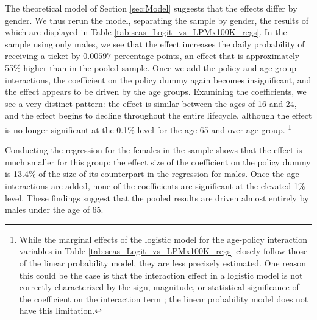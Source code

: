 The theoretical model of Section \ref{sec:Model} 
suggests that the effects differ by gender. 
We thus rerun the model, separating the sample by gender, 
the results of which are displayed in 
Table \ref{tab:seas_Logit_vs_LPMx100K_regs}.
In the sample using only males, 
we see that the effect increases the daily probability of receiving a ticket by $0.00597$ 
percentage points, an effect that is approximately 55\% higher than in the pooled sample. 
Once we add the policy and age group interactions, 
the coefficient on the policy dummy again becomes insignificant, 
and the effect appears to be driven by the age groups. 
Examining the coefficients, we see a very distinct pattern: 
the effect is similar between the ages of 16 and 24, 
and the effect begins to decline throughout the entire lifecycle, 
although the effect is no longer significant at the 0.1\% level for the age 65 and over age group.%
\footnote{%
While the marginal effects of the logistic model for the age-policy interaction variables in 
Table \ref{tab:seas_Logit_vs_LPMx100K_regs}
closely follow those of the linear probability model, they are less precisely estimated. 
One reason this could be the case is that the interaction effect in a logistic model 
is not correctly characterized by the
sign, magnitude, or statistical significance of the coefficient on the
interaction term 
\citep{ainorton2003};
the linear probability model does not have this limitation.
}
%

Conducting the regression for the females in the sample shows that 
the effect is much smaller for this group: 
the effect size of the coefficient on the policy dummy is 13.4\% of the size of its counterpart 
in the regression for males. 
Once the age interactions are added, none of the coefficients are significant at the elevated 1\% level. 
These findings suggest that the pooled results are driven almost entirely by males under the age of 65.

